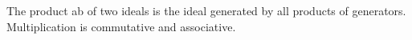 The product ab of two ideals is the ideal generated by all products of generators. Multiplication is commutative and associative.

